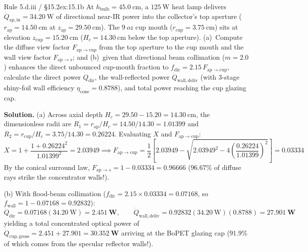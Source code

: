 \begin{workedexample}{Rule 5.d.iii / §15.2}{ex:15.1b}
At $h_{\mathrm{bulb}} = \SI{45.0}{\centi\meter}$, a $\SI{125}{\watt}$ heat lamp delivers $\dot{Q}_{\mathrm{ap,in}} = \SI{34.20}{\watt}$ of directional near-IR power into the collector's top aperture ($r_{\mathrm{ap}} = \SI{14.50}{\centi\meter}$ at $z_{\mathrm{ap}} = \SI{29.50}{\centi\meter}$). The $\SI{9}{oz}$ cup mouth ($r_{\mathrm{cup}} = \SI{3.75}{\centi\meter}$) sits at elevation $z_{\mathrm{cup}} = \SI{15.20}{\centi\meter}$ ($H_c = \SI{14.30}{\centi\meter}$ below the top aperture). (a)~Compute the diffuse view factor $F_{\mathrm{ap}\to\mathrm{cup}}$ from the top aperture to the cup mouth and the wall view factor $F_{\mathrm{ap}\to s}$; and (b)~given that directional beam collimation ($m=2.0$) enhances the direct unbounced cup-mouth fraction to $f_{\mathrm{dir}} = 2.15\,F_{\mathrm{ap}\to\mathrm{cup}}$, calculate the direct power $\dot{Q}_{\mathrm{dir}}$, the wall-reflected power $\dot{Q}_{\mathrm{wall,deliv}}$ (with 3-stage shiny-foil wall efficiency $\eta_{\mathrm{cone}} = 0.8788$), and total power reaching the cup glazing cap.

\textbf{Solution.}
(a) Across axial depth $H_c = 29.50 - 15.20 = \SI{14.30}{\centi\meter}$, the dimensionless radii are $R_1 = r_{\mathrm{ap}}/H_c = 14.50/14.30 = 1.01399$ and $R_2 = r_{\mathrm{cup}}/H_c = 3.75/14.30 = 0.26224$. Evaluating $X$ and $F_{\mathrm{ap}\to\mathrm{cup}}$:
\[
  X = 1 + \frac{1 + 0.26224^2}{1.01399^2} = 2.03949 \implies F_{\mathrm{ap}\to\mathrm{cup}} = \frac{1}{2}\!\left[2.03949 - \sqrt{2.03949^2 - 4\!\left(\frac{0.26224}{1.01399}\right)^{\!2}}\right] = \mathbf{0.03334}
\]
By the conical surround law, $F_{\mathrm{ap}\to s} = 1 - 0.03334 = \mathbf{0.96666}$ ($96.67\%$ of diffuse rays strike the concentrator walls!).

(b) With flood-beam collimation ($f_{\mathrm{dir}} = 2.15 \times 0.03334 = 0.07168$, so $f_{\mathrm{wall}} = 1 - 0.07168 = 0.92832$):
\[
  \dot{Q}_{\mathrm{dir}} = 0.07168(\SI{34.20}{\watt}) = \mathbf{\SI{2.451}{\watt}}, \qquad
  \dot{Q}_{\mathrm{wall,deliv}} = 0.92832(\SI{34.20}{\watt})(0.8788) = \mathbf{\SI{27.901}{\watt}}
\]
yielding a total concentrated optical power of $\dot{Q}_{\mathrm{cup,gross}} = 2.451 + 27.901 = \mathbf{\SI{30.352}{\watt}}$ arriving at the BoPET glazing cap ($91.9\%$ of which comes from the specular reflector walls!).
\end{workedexample}

